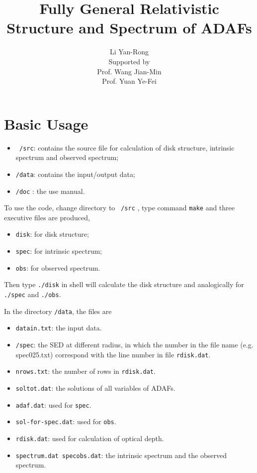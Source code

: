 \documentclass[12pt]{book}
\title{Fully General Relativistic Structure and Spectrum of ADAFs}
\begin{document}
\author{\vspace{0.7in}Li Yan-Rong\\
Supported by \\
Prof. Wang Jian-Min\\
Prof. Yuan Ye-Fei}
\maketitle
\tableofcontents
\chapter{Basic Usage}
\begin{itemize}
 \item \texttt{ /src}: contains the source file for calculation of disk structure, intrinsic spectrum and observed spectrum;
\item \texttt{/data}: contains the input/output data;
\item \texttt{/doc} : the use manual.
\end{itemize}

To use the code, change directory to \texttt{ /src} , type command \texttt{make} and three executive files are produced,
\begin{itemize}
 \item \texttt{disk}: for disk structure;
\item \texttt{spec}: for intrinsic spectrum;
\item \texttt{obs}: for observed spectrum.
\end{itemize}
Then type \texttt{./disk} in shell will calculate the disk structure and analogically for \texttt{./spec} and 
\texttt{./obs}.

In the directory \texttt{/data}, the files are
\begin{itemize}
 \item \texttt{datain.txt}: the input data.
\item \texttt{/spec}: the SED at different radius, in which the number in the file name (e.g. spec025.txt) correspond with the line number in file \texttt{rdisk.dat}.
\item \texttt{nrows.txt}: the number of rows in \texttt{rdisk.dat}.
\item \texttt{soltot.dat}: the solutions of all variables of ADAFs.
\item \texttt{adaf.dat}: used for \texttt{spec}.
\item \texttt{sol-for-spec.dat}: used for \texttt{obs}.
\item \texttt{rdisk.dat}: used for calculation of optical depth.
\item \texttt{spectrum.dat specobs.dat}: the intrinsic spectrum and the observed spectrum.
\end{itemize}
 
\end{document}
